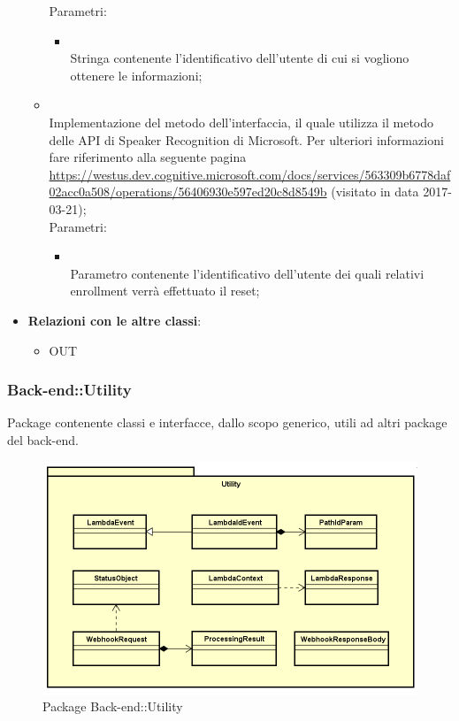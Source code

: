 \begin{itemize}
\begin{itemize}
		Parametri:
		\begin{itemize}
			\item {} \\
			Stringa contenente l'identificativo dell'utente di cui si vogliono ottenere le informazioni;
		\end{itemize}
		\item[]  \\		Implementazione del metodo dell'interfaccia, il quale utilizza il metodo  delle API di Speaker Recognition di Microsoft. Per ulteriori informazioni fare riferimento alla seguente pagina \url{https://westus.dev.cognitive.microsoft.com/docs/services/563309b6778daf02acc0a508/operations/56406930e597ed20c8d8549b}  (visitato in data 2017-03-21);\\
		Parametri:
		\begin{itemize}
			\item {} \\
			Parametro contenente l'identificativo dell'utente dei quali relativi enrollment verrà effettuato il reset;
		\end{itemize}
	\end{itemize}
	\item \textbf{Relazioni con le altre classi}:
	\begin{itemize}
		\item OUT \hyperlink{VocalLoginModuleConfig_label}{}
	\end{itemize}
\end{itemize}
\FloatBarrier
\newpage
\subsubsection{Back-end::Utility}
Package contenente classi e interfacce, dallo scopo generico, utili ad altri package del back-end.
\begin{figure}[h] \centering \includegraphics[width=\textwidth,height=\textheight,keepaspectratio]{images/diagrams/back-end/Official_Backend_0304/Utility.png}
	\caption{Package Back-end::Utility}
\end{figure}

